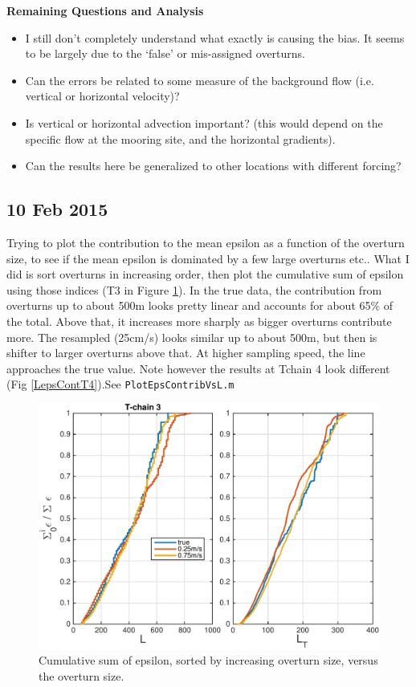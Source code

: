 \documentclass[11pt]{article}
\begin{document}
\textbf{Remaining Questions and Analysis}
\begin{itemize}
\item I still don't completely understand what exactly is causing the bias. It seems to be largely due to the `false' or mis-assigned overturns. 
\item Can the errors be related to some measure of the background flow (i.e. vertical or horizontal velocity)? 
\item Is vertical or horizontal advection important? (this would depend on the specific flow at the mooring site, and the horizontal gradients).
\item Can the results here be generalized to other locations with different forcing?
\end{itemize}




\clearpage
\newpage
\subsection{10 Feb 2015}

Trying to plot the contribution to the mean epsilon as a function of the overturn size, to see if the mean epsilon is dominated by a few large overturns etc.. What I did is sort overturns in increasing order, then plot the cumulative sum of epsilon using those indices (T3 in Figure \ref{LepsCont}). In the true data, the contribution from overturns up to about 500m looks pretty linear and accounts for about 65\% of the total. Above that, it increases more sharply as bigger overturns contribute more. The resampled (25cm/s) looks similar up to about 500m, but then is shifter to larger overturns above that. At higher sampling speed, the line approaches the true value. Note however the results at Tchain 4 look different (Fig \ref{LepsContT4}).See \verb+PlotEpsContribVsL.m+


\begin{figure}[htbp]
\includegraphics[scale=0.8]{Tchain3_EpsContribVsLot.pdf}
\caption{Cumulative sum of epsilon, sorted by increasing overturn size, versus the overturn size.}
\label{LepsCont}
\end{figure}
\end{document}
